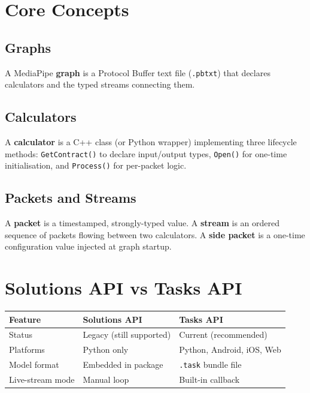 \documentclass[12pt,a4paper]{article}
\begin{document}
\bigskip

\section{Core Concepts}

\subsection{Graphs}

A MediaPipe \textbf{graph} is a Protocol Buffer text file (\texttt{.pbtxt}) that declares
calculators and the typed streams connecting them.

\subsection{Calculators}

A \textbf{calculator} is a C++ class (or Python wrapper) implementing three lifecycle
methods: \texttt{GetContract()} to declare input/output types, \texttt{Open()} for one-time
initialisation, and \texttt{Process()} for per-packet logic.

\subsection{Packets and Streams}

A \textbf{packet} is a timestamped, strongly-typed value.
A \textbf{stream} is an ordered sequence of packets flowing between two calculators.
A \textbf{side packet} is a one-time configuration value injected at graph startup.

\section{Solutions API vs Tasks API}

\begin{center}
\begin{tabular}{lll}
\toprule
\textbf{Feature} & \textbf{Solutions API} & \textbf{Tasks API} \\
\midrule
Status & Legacy (still supported) & Current (recommended) \\
Platforms & Python only & Python, Android, iOS, Web \\
Model format & Embedded in package & \texttt{.task} bundle file \\
Live-stream mode & Manual loop & Built-in callback \\
\bottomrule
\end{tabular}
\end{center}
\end{document}
